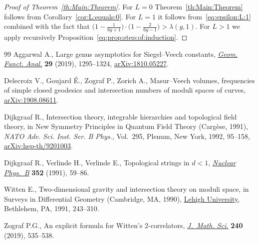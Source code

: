 \documentclass[11pt]{article}
\theoremstyle{definition}
\begin{document}
\begin{proof}[Proof of Theorem~\ref{th:Main:Theorem}]
For $L=0$ Theorem~\ref{th:Main:Theorem} follows from
Corollary~\ref{cor:L:equals:0}. For $L=1$ it follows from~\eqref{eq:epsilon:L:1}
combined with the fact that $\big(1-\frac{1}{6g+1}\big)
\cdot\big(1-\frac{2}{6g-1}\big)>\lambda(g,1)$.
For $L>1$ we apply recursively Proposition~\ref{eq:prop:step:of:induction}.
\end{proof}
\begin{thebibliography}{99}
Aggarwal A., Large genus asymptotics for {S}iegel--{V}eech constants,
 \href{https://doi.org/10.1007/s00039-019-00509-0}{\textit{Geom. Funct. Anal.}} \textbf{29} (2019), 1295--1324,
 \href{https://arxiv.org/abs/1810.05227}{arXiv:1810.05227}.

Delecroix V., Goujard \'E., Zograf P., Zorich A., Masur--{V}eech volumes,
 frequencies of simple closed geodesics and intersection numbers of moduli
 spaces of curves, \href{https://arxiv.org/abs/1908.08611}{arXiv:1908.08611}.

Dijkgraaf R., Intersection theory, integrable hierarchies and topological field
 theory, in New Symmetry Principles in Quantum Field Theory ({C}arg\`ese,
 1991), \textit{NATO Adv. Sci. Inst. Ser. B Phys.}, Vol.~295, Plenum, New
 York, 1992, 95--158, \href{https://arxiv.org/abs/hep-th/9201003}{arXiv:hep-th/9201003}.

Dijkgraaf R., Verlinde H., Verlinde E., Topological strings in {$d<1$},
 \href{https://doi.org/10.1016/0550-3213(91)90129-L}{\textit{Nuclear Phys.~B}} \textbf{352} (1991), 59--86.

Witten E., Two-dimensional gravity and intersection theory on moduli space, in
 Surveys in Differential Geometry ({C}ambridge, {MA}, 1990), \href{https://dx.doi.org/10.4310/SDG.1990.v1.n1.a5}{Lehigh
 University}, Bethlehem, PA, 1991, 243--310.

Zograf P.G., An explicit formula for {W}itten's 2-correlators, \href{https://doi.org/10.1007/s10958-019-04371-1}{\textit{J.~Math.
 Sci.}} \textbf{240} (2019), 535--538.

\end{thebibliography}
\end{document}
